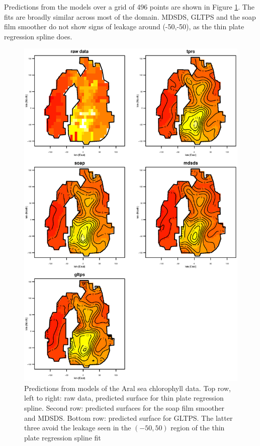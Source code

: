 \documentclass[smallextended]{svjour3}       %
\begin{document}
Predictions from the models over a grid of 496 points are shown in Figure \ref{aral-plot}. The fits are broadly similar across most of the domain. MDSDS, GLTPS and the soap film smoother do not show signs of leakage around (-50,-50), as the thin plate regression spline does.

\begin{figure}
\centering
\includegraphics[height=0.8\textheight]{Fig7.eps}
\caption{Predictions from models of the Aral sea chlorophyll data. Top row, left to right: raw data, predicted surface for thin plate regression spline. Second row: predicted surfaces for the soap film smoother and MDSDS. Bottom row: predicted surface for GLTPS. The latter three avoid the leakage seen in the $(-50, 50)$ region of the thin plate regression spline fit}
\label{aral-plot}
\end{figure}
\end{document}
